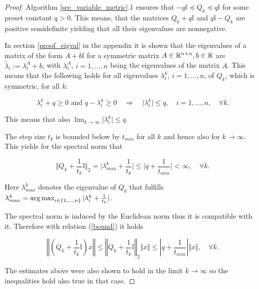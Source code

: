 \begin{proof}
	
	Algorithm \ref{sec_variable_metric}.1 ensures that \( -q \mathbb{I}  \preccurlyeq Q_k \preccurlyeq q\mathbb{I} \) for some preset constant \(q >0\). This means, that the matrices \(Q_k + q\mathbb{I} \) and \(q \mathbb{I} - Q_k \) are positive semidefinite yielding that all their eigenvalues are nonnegative.
	
In section \ref{proof_eigval} in the appendix it is shown that the eigenvalues of a matrix of the form \(A+b\mathbb{I}\) for a symmetric matrix \(A \in \mathbb{R}^{n\times n}, b \in \mathbb{R}\) are \(\tilde{\lambda}_i := \lambda^A_i+b \), with \(\lambda^A_i\), \(i =1,...,n\) being the eigenvalues of the matrix \(A\).
This means that the following holds for all eigenvalues \(\lambda^k_{i}\), \(i = 1,...,n\), of \(Q_k\), which is symmetric, for all \(k\):

\begin{equation*}
	\lambda^k_{i} + q \geq 0 \text{ and } q - \lambda^k_{i} \geq 0 \quad \Rightarrow \quad \vert \lambda^k_{i} \vert \leq q, \quad  i = 1,...,n, \quad  \forall k.
\end{equation*}
	
	This means that also \(\lim_{k \to \infty} \vert \lambda^k_{i} \vert \leq q\).
	
The step size \(t_k\) is bounded below by \(t_{min}\) for all \(k\) and hence also for \(k \to \infty\). This yields for the spectral norm that

\begin{equation}
		\Vert Q_k+\frac{1}{t_k}\mathbb{I} \Vert_2 =  \vert \lambda^k_{max}+\frac{1}{t_k} \vert \leq \vert q+\frac{1}{t_{min}} \vert < \infty, \quad \forall k.
		\label{bound}
\end{equation}

Here \(\lambda^k_{max}\) denotes the eigenvalue of \(Q_k\)  that fulfills \(\lambda^k_{max} = \operatorname*{arg\,max}_{i \in \{1,...,n\}} \vert \lambda^k_{i}+\frac{1}{t_k} \vert\).

The spectral norm is induced by the Euclidean norm thus it is compatible with it. Therefore with relation (\ref{bound}) it holds

\[ \left\Vert \left(Q_k+\frac{1}{t_k}\mathbb{I}\right)x \right\Vert \leq \left\Vert Q_k+\frac{1}{t_k}\mathbb{I} \right\Vert_2 \Vert x \Vert \leq \left\vert q+\frac{1}{t_{min}} \right\vert \Vert x \Vert , \quad \forall k.\]

The estimates above were also shown to hold in the limit \(k \to \infty\) so the inequalities hold also true in that case. 
\end{proof}



